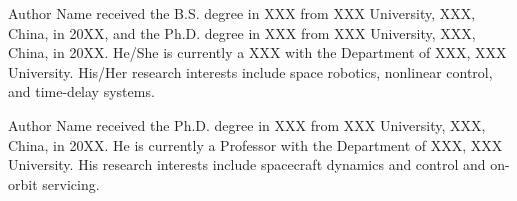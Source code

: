 
\begin{IEEEbiographynophoto}{Author Name}
received the B.S. degree in XXX from XXX University, XXX, China, in 20XX, and
the Ph.D. degree in XXX from XXX University, XXX, China, in 20XX. He/She is
currently a XXX with the Department of XXX, XXX University. His/Her research
interests include space robotics, nonlinear control, and time-delay systems.
\end{IEEEbiographynophoto}

\begin{IEEEbiographynophoto}{Author Name}
received the Ph.D. degree in XXX from XXX University, XXX, China, in 20XX. He
is currently a Professor with the Department of XXX, XXX University. His
research interests include spacecraft dynamics and control and on-orbit
servicing.
\end{IEEEbiographynophoto}
